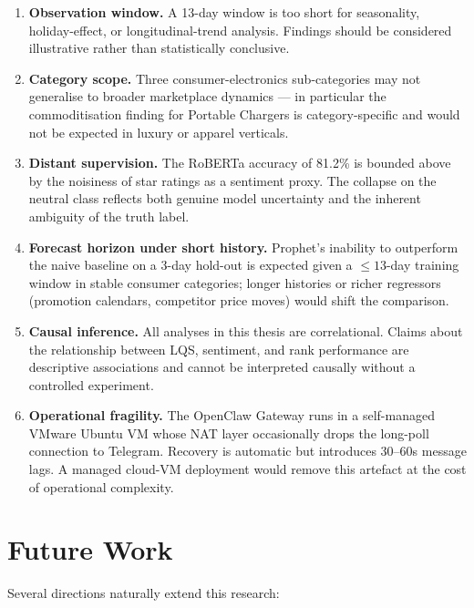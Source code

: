 \begin{enumerate}
  \item \textbf{Observation window.} A 13-day window is too short for
  seasonality, holiday-effect, or longitudinal-trend analysis. Findings
  should be considered illustrative rather than statistically conclusive.

  \item \textbf{Category scope.} Three consumer-electronics
  sub-categories may not generalise to broader marketplace dynamics ---
  in particular the commoditisation finding for Portable Chargers is
  category-specific and would not be expected in luxury or apparel
  verticals.

  \item \textbf{Distant supervision.} The RoBERTa accuracy of 81.2\% is
  bounded above by the noisiness of star ratings as a sentiment proxy.
  The collapse on the neutral class reflects both genuine model
  uncertainty and the inherent ambiguity of the truth label.

  \item \textbf{Forecast horizon under short history.} Prophet's
  inability to outperform the naive baseline on a 3-day hold-out is
  expected given a $\le 13$-day training window in stable consumer
  categories; longer histories or richer regressors (promotion calendars,
  competitor price moves) would shift the comparison.

  \item \textbf{Causal inference.} All analyses in this thesis are
  correlational. Claims about the relationship between LQS, sentiment,
  and rank performance are descriptive associations and cannot be
  interpreted causally without a controlled experiment.

  \item \textbf{Operational fragility.} The OpenClaw Gateway runs in a
  self-managed VMware Ubuntu VM whose NAT layer occasionally drops the
  long-poll connection to Telegram. Recovery is automatic but introduces
  30--60s message lags. A managed cloud-VM deployment would remove this
  artefact at the cost of operational complexity.
\end{enumerate}

\section{Future Work}

Several directions naturally extend this research:

